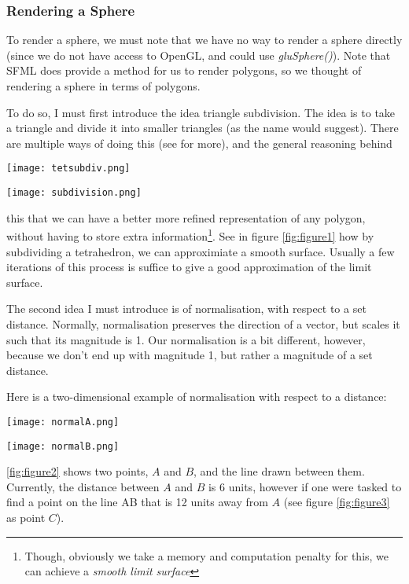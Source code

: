 \documentclass[main.tex]{subfiles}
\begin{document}
\subsubsection{Rendering a Sphere}
To render a sphere, we must note that we have no way to render a sphere directly (since we do not have access to OpenGL, and could use \textit{gluSphere()}). 
Note that SFML does provide a method for us to render polygons, so we thought of rendering a sphere in terms of polygons.

To do so, I must first introduce the idea triangle subdivision. The idea is to take a triangle and divide it into smaller triangles (as the name would suggest).
There are multiple ways of doing this (see \cite{Stam2010EvaluationOL} for more), and the general reasoning behind 
\begin{figure*} \texttt{[image: tetsubdiv.png]} \caption{Image shows the tetrahedron being subdivided 0, 1, 2, 6 times} \label{fig:figure1} \end{figure*}
\begin {figure*} \texttt{[image: subdivision.png]} \caption{shows the subdivison process on a equilateral triangle} \label{fig:figure2} \end{figure*}
this that we can have a better more refined representation of any polygon, without having to store extra information\footnote{Though, obviously we take
a memory and computation penalty for this, we can achieve a \textit{smooth limit surface}}. See in figure \ref{fig:figure1} how by subdividing a tetrahedron, 
we can approximiate a smooth surface. Usually a few iterations of this process is suffice to give a good approximation of the limit surface.

The second idea I must introduce is of normalisation, with respect to a set distance. Normally, normalisation preserves the direction of a vector, but scales it such that 
its magnitude is 1. Our normalisation is a bit different, however, because we don't end up with magnitude 1, but rather a magnitude of a set distance.

Here is a two-dimensional example of normalisation with respect to a distance:
\begin{figure*}[hbt!] \texttt{[image: normalA.png]}\label{fig:figure2}\caption{shows two point A and B and the line between them}
\end{figure*}
\begin{figure*}[hbt!]\texttt{[image: normalB.png]}\label{fig:figure3}\caption[width=0.5\columnwidth]{shows the point C, which is 12 units away from A}\end{figure*}
\ref{fig:figure2} shows two points, $A$ and $B$, and the line drawn between them. Currently, the distance between $A$ and $B$ is 6 units, however if one were tasked to find
a point on the line AB that is 12 units away from $A$ (see figure \ref{fig:figure3} as point $C$).
\end{document}
